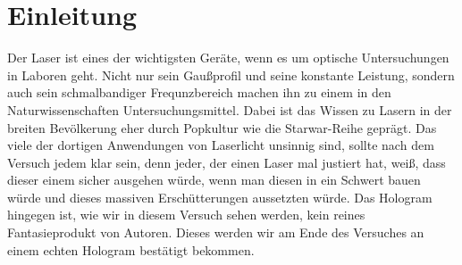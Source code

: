 

\chapter{Einleitung}
\label{chap:einleitung}

Der Laser ist eines der wichtigsten Geräte, wenn es um optische Untersuchungen in Laboren geht. Nicht nur sein Gaußprofil 
und seine konstante Leistung, sondern auch sein schmalbandiger Frequnzbereich machen ihn zu einem in den Naturwissenschaften
Untersuchungsmittel. Dabei ist das Wissen zu Lasern in der breiten Bevölkerung eher durch Popkultur wie die Starwar-Reihe geprägt.
Das viele der dortigen Anwendungen von Laserlicht unsinnig sind, sollte nach dem Versuch jedem klar sein, denn jeder, der einen Laser mal
justiert hat, weiß, dass dieser einem sicher ausgehen würde, wenn man diesen in ein Schwert bauen würde und dieses massiven Erschütterungen aussetzten
würde. Das Hologram hingegen ist, wie wir in diesem Versuch sehen werden, kein reines Fantasieprodukt von Autoren.
Dieses werden wir am Ende des Versuches an einem echten Hologram bestätigt bekommen.